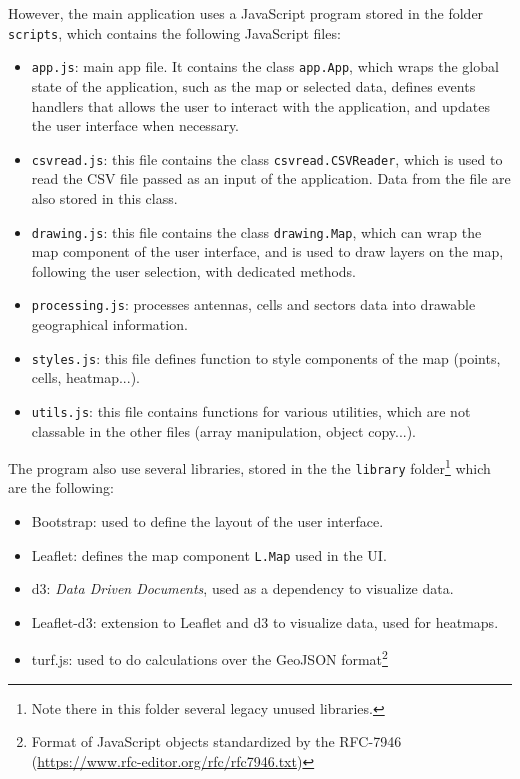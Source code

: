 \documentclass[a4paper, 11pt]{report}
\begin{document}
    However, the main application uses a JavaScript program stored in the folder \texttt{scripts}, which contains
    the following JavaScript files:

    \begin{itemize}
        \item \texttt{app.js}: main app file. It contains the class \texttt{app.App}, which wraps the global state
        of the application, such as the map or selected data, defines events handlers that allows the user
        to interact with the application, and updates the user interface when necessary.
        \item \texttt{csvread.js}: this file contains the class \texttt{csvread.CSVReader}, which is used to read the
        CSV file passed as an input of the application. Data from the file are also stored in this class.
        \item \texttt{drawing.js}: this file contains the class \texttt{drawing.Map}, which can wrap the map component
        of the user interface, and is used to draw layers on the map, following the user selection, with dedicated methods.
        \item \texttt{processing.js}: processes antennas, cells and sectors data into drawable geographical information.
        \item \texttt{styles.js}: this file defines function to style components of the map (points, cells, heatmap...).
        \item \texttt{utils.js}: this file contains functions for various utilities, which are not classable in the other
        files (array manipulation, object copy...).
    \end{itemize}

    The program also use several libraries, stored in the the \texttt{library} folder\footnote{Note there in this folder several legacy unused libraries.} 
    which are the following:

    \begin{itemize}
        \item Bootstrap: used to define the layout of the user interface.
        \item Leaflet: defines the map component \texttt{L.Map} used in the UI.
        \item d3: \textit{Data Driven Documents}, used as a dependency to visualize data.
        \item Leaflet-d3: extension to Leaflet and d3 to visualize data, used for heatmaps.
        \item turf.js: used to do calculations over the GeoJSON format\footnote{Format of JavaScript objects
        standardized by the RFC-7946 (\url{https://www.rfc-editor.org/rfc/rfc7946.txt})}
    \end{itemize}
\end{document}
